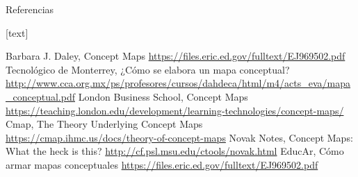 \documentclass[
	11pt, %
]{beamer}
\begin{document}
\begin{frame}{Referencias}
  \begin{thebibliography}{10}
    [text]

      Barbara J. Daley, Concept Maps \url{https://files.eric.ed.gov/fulltext/EJ969502.pdf}
    Tecnológico de Monterrey, ¿Cómo se elabora un mapa conceptual? \url{http://www.cca.org.mx/ps/profesores/cursos/dahdeca/html/m4/acts_eva/mapa_conceptual.pdf}
    London Business School, Concept Maps \url{https://teaching.london.edu/development/learning-technologies/concept-maps/}
    Cmap, The Theory Underlying Concept Maps \url{https://cmap.ihmc.us/docs/theory-of-concept-maps}
    Novak Notes, Concept Maps: What the heck is this? \url{http://cf.psl.msu.edu/ctools/novak.html}
    EducAr, Cómo armar mapas conceptuales \url{https://files.eric.ed.gov/fulltext/EJ969502.pdf}
  \end{thebibliography}
\end{frame}
\end{document}
